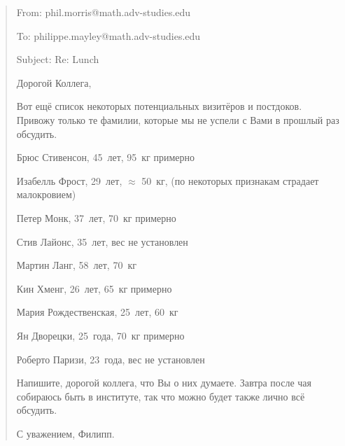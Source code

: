 \begin{quote}
From: phil.morris@math.adv-studies.edu

To: philippe.mayley@math.adv-studies.edu

Subject: Re: Lunch

\medskip
Дорогой Коллега,

Вот ещё список некоторых потенциальных визитёров и постдоков.
Привожу только те фамилии, которые мы не успели с Вами в прошлый раз обсудить.

Брюс Стивенсон, 45~лет, 95~кг примерно

Изабелль Фрост, 29~лет, $\approx$ 50~кг, (по некоторых признакам страдает
малокровием)

Петер Монк, 37~лет, 70~кг примерно

Стив Лайонс, 35~лет, вес не установлен

Мартин Ланг, 58~лет, 70~кг

Кин Хменг, 26~лет, 65~кг примерно

Мария Рождественская, 25~лет, 60~кг

Ян Дворецки, 25~года, 70~кг примерно

Роберто Паризи, 23~года, вес не установлен

Напишите, дорогой коллега, что Вы о них думаете.
Завтра после чая собираюсь быть в институте, так что можно будет также лично всё
обсудить.

С уважением, Филипп.
\end{quote}
